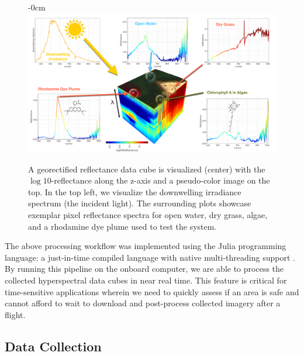 \documentclass[remotesensing,article,accept,pdftex,moreauthors]{Definitions/mdpi}
\begin{document}
\begin{figure}[H]
\begin{adjustwidth}{-\extralength}{0cm}
\centering
\vspace{-0.1in}
\includegraphics[width=15.5cm]{figures/materials-and-methods/HyperSpectralInfoGraphic.pdf}
\end{adjustwidth}
\caption{A georectified reflectance data cube is visualized (center) with the $\log10$-reflectance along the z-axis and a pseudo-color image on the top. In the top left, we visualize the downwelling irradiance spectrum (the incident light). The surrounding plots showcase exemplar pixel reflectance spectra for open water, dry grass, algae, and a rhodamine dye plume used to test the system.\label{fig:hsi-infographic}}
\end{figure}  

The above processing workflow was implemented using the Julia programming language: a just-in-time compiled language with native multi-threading support \cite{julia-1}. By running this pipeline on the onboard computer, we are able to process the collected hyperspectral data cubes in near real time. This feature is critical for time-sensitive applications wherein we need to quickly assess if an area is safe and cannot afford to wait to download and post-process collected imagery after a flight.

\subsection{Data Collection}
\end{document}
